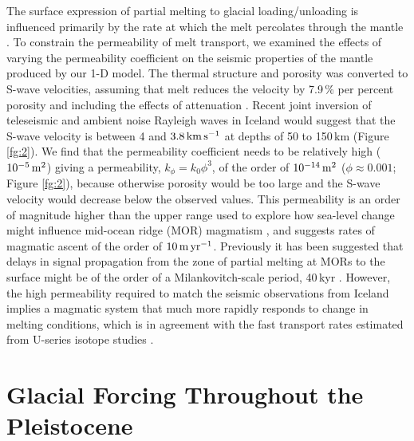 \documentclass[draft,linenumbers]{agujournal2018}
\begin{document}
The surface expression of partial melting to glacial loading/unloading is influenced primarily by the rate at which the melt percolates through the mantle \citep{burley-2015}. To constrain the permeability of melt transport, we examined the effects of varying the permeability coefficient on the seismic properties of the mantle produced by our 1-D model. The thermal structure and porosity was converted to S-wave velocities, assuming that melt reduces the velocity by 7.9\,\% per percent porosity \citep{hammond-2000} and including the effects of attenuation \citep{goes-etal-2012}. Recent joint inversion of teleseismic and ambient noise Rayleigh waves in Iceland would suggest that the S-wave velocity is between 4 and $3.8\rm\,km\,s^{-1}$ at depths of 50 to 150\,km \citep{harmon-2016} (Figure \ref{fg:2}). We find that the permeability coefficient needs to be relatively high ($10^{-5}\rm\,m^{2}$) giving a permeability, $k_{\phi} = k_{0}\phi^{3}$, of the order of $10^{-14}\rm\,m^{2}$ ($\phi \approx 0.001$; Figure \ref{fg:2}), because otherwise porosity would be too large and the S-wave velocity would decrease below the observed values. This permeability is an order of magnitude higher than the upper range used to explore how sea-level change might influence mid-ocean ridge (MOR) magmatism \citep{crowley-etal-2015,burley-2015}, and suggests rates of magmatic ascent of the order of $10\rm\,m\,yr^{-1}$. Previously it has been suggested that delays in signal propagation from the zone of partial melting at MORs to the surface might be of the order of a Milankovitch-scale period, 40\,kyr \citep{huybers-2017}. However, the high permeability required to match the seismic observations from Iceland implies a magmatic system that much more rapidly responds to change in melting conditions, which is in agreement with the fast transport rates estimated from U-series isotope studies \citep{elliot-2014}.

\section{Glacial Forcing Throughout the Pleistocene}
\end{document}
